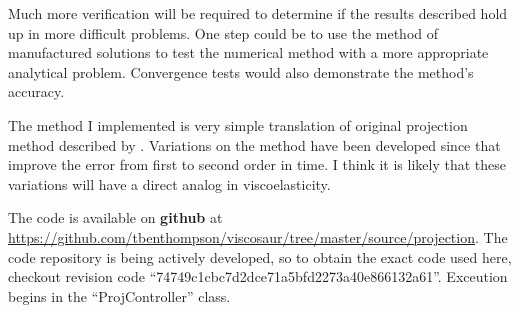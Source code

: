 \documentclass[a4paper]{article}
\begin{document}
Much more verification will be required to determine if the results described hold up in more difficult problems.
One step could be to use the method of manufactured solutions to test the numerical method with a more appropriate analytical problem.
Convergence tests would also demonstrate the method's accuracy. 

The method I implemented is very simple translation of original projection method described by \citet{Chorin1968}. 
Variations on the method have been developed since that improve the error from first to second order in time. I think it
is likely that these variations will have a direct analog in viscoelasticity.

The code is available on \textbf{github} at \url{https://github.com/tbenthompson/viscosaur/tree/master/source/projection}. 
The code repository is being actively developed, so to obtain the exact code used here, checkout revision code ``74749c1cbc7d2dce71a5bfd2273a40e866132a61''. 
Exceution begins in the ``ProjController'' class.


\end{document}
